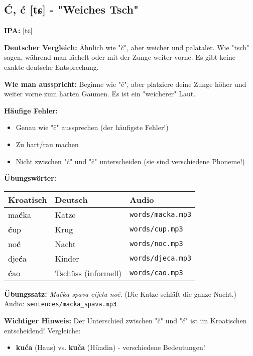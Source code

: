 \subsection{Ć, ć [tɕ] - "Weiches Tsch"}

\begin{tcolorbox}[colback=lightblue!30, colframe=croatianblue, title=\textbf{Ć, ć}]

\textbf{IPA:} [tɕ]

\textbf{Deutscher Vergleich:}
Ähnlich wie "č", aber weicher und palataler. Wie "tsch" sagen, während man lächelt oder mit der Zunge weiter vorne. Es gibt keine exakte deutsche Entsprechung.

\textbf{Wie man ausspricht:}
Beginne wie "č", aber platziere deine Zunge höher und weiter vorne zum harten Gaumen. Es ist ein "weicherer" Laut.

\textbf{Häufige Fehler:}
\begin{itemize}
    \item Genau wie "č" aussprechen (der häufigste Fehler!)
    \item Zu hart/rau machen
    \item Nicht zwischen "ć" und "č" unterscheiden (sie sind verschiedene Phoneme!)
\end{itemize}

\textbf{Übungswörter:}
\begin{tabular}{lll}
\textbf{Kroatisch} & \textbf{Deutsch} & \textbf{Audio} \\
\midrule
ma\textbf{ć}ka & Katze & \texttt{words/macka.mp3} \\
\textbf{ć}up & Krug & \texttt{words/cup.mp3} \\
no\textbf{ć} & Nacht & \texttt{words/noc.mp3} \\
dje\textbf{ć}a & Kinder & \texttt{words/djeca.mp3} \\
\textbf{ć}ao & Tschüss (informell) & \texttt{words/cao.mp3} \\
\end{tabular}

\textbf{Übungssatz:}
\textit{Mačka spava cijelu noć.}
(Die Katze schläft die ganze Nacht.)
Audio: \texttt{sentences/macka\_spava.mp3}

\textbf{Wichtiger Hinweis:}
Der Unterschied zwischen "č" und "ć" ist im Kroatischen entscheidend! Vergleiche:
\begin{itemize}
    \item \textbf{kuća} (Haus) vs. \textbf{kuča} (Hündin) - verschiedene Bedeutungen!
\end{itemize}

\end{tcolorbox}


